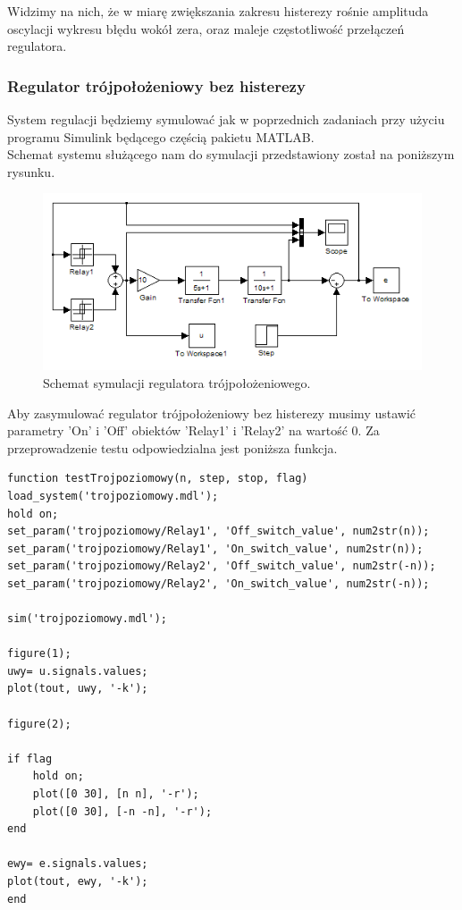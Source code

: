 \documentclass[a4paper,10pt]{article}
\begin{document}
\newpage Widzimy na nich, że w miarę zwiększania zakresu histerezy rośnie amplituda oscylacji wykresu błędu wokół zera, oraz maleje częstotliwość przełączeń regulatora.

\subsubsection{Regulator trójpołożeniowy bez histerezy}\label{sec:r3bh}%

System regulacji będziemy symulować jak w poprzednich zadaniach przy użyciu programu Simulink będącego częścią pakietu M\small ATLAB. \\
\normalsize Schemat systemu służącego nam do symulacji przedstawiony został na poniższym rysunku.

\begin{figure}[!h]
    \centering
	\includegraphics[width=120mm]{CW3-schemat-3.png}
	\caption{Schemat symulacji regulatora trójpołożeniowego.}
    \label{fig:Rysunek}
\end{figure}

Aby zasymulować regulator trójpołożeniowy bez histerezy musimy ustawić parametry 'On' i 'Off' obiektów 'Relay1' i 'Relay2' na wartość 0.
\newpage Za przeprowadzenie testu odpowiedzialna jest poniższa funkcja.

\begin{lstlisting}[caption=Funkcja testująca regulator dwupoziomowy bez histerezy.]
function testTrojpoziomowy(n, step, stop, flag)
load_system('trojpoziomowy.mdl');
hold on;
set_param('trojpoziomowy/Relay1', 'Off_switch_value', num2str(n));
set_param('trojpoziomowy/Relay1', 'On_switch_value', num2str(n));
set_param('trojpoziomowy/Relay2', 'Off_switch_value', num2str(-n));
set_param('trojpoziomowy/Relay2', 'On_switch_value', num2str(-n));

sim('trojpoziomowy.mdl');

figure(1);
uwy= u.signals.values;    
plot(tout, uwy, '-k');

figure(2);

if flag
    hold on;
    plot([0 30], [n n], '-r');
    plot([0 30], [-n -n], '-r');
end

ewy= e.signals.values;    
plot(tout, ewy, '-k');
end
\end{lstlisting}
\end{document}
